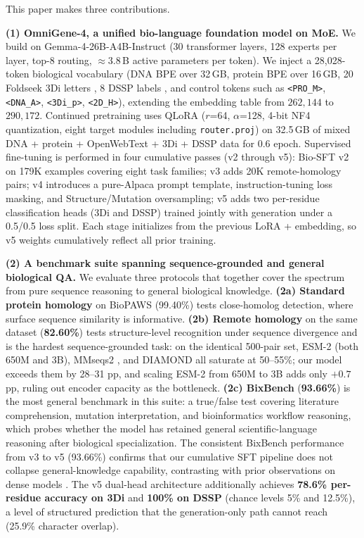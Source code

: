 \documentclass[11pt]{article}
\begin{document}
This paper makes three contributions.

\textbf{(1) OmniGene-4, a unified bio-language foundation model on MoE.} We build on Gemma-4-26B-A4B-Instruct \citep{gemmateam2025} (30 transformer layers, 128 experts per layer, top-8 routing, $\approx 3.8$\,B active parameters per token). We inject a 28{,}028-token biological vocabulary (DNA BPE over 32\,GB, protein BPE over 16\,GB, 20 Foldseek 3Di letters \citep{vankempen2024foldseek}, 8 DSSP labels \citep{kabsch1983dssp}, and control tokens such as \texttt{<PRO\_M>}, \texttt{<DNA\_A>}, \texttt{<3Di\_p>}, \texttt{<2D\_H>}), extending the embedding table from $262{,}144$ to $290{,}172$. Continued pretraining uses QLoRA \citep{dettmers2023qlora, hu2022lora} ($r$=64, $\alpha$=128, 4-bit NF4 quantization, eight target modules including \texttt{router.proj}) on 32.5\,GB of mixed DNA + protein + OpenWebText + 3Di + DSSP data for 0.6 epoch. Supervised fine-tuning is performed in four cumulative passes (v2 through v5): Bio-SFT v2 on 179K examples covering eight task families; v3 adds 20K remote-homology pairs; v4 introduces a pure-Alpaca prompt template, instruction-tuning loss masking, and Structure/Mutation oversampling; v5 adds two per-residue classification heads (3Di and DSSP) trained jointly with generation under a 0.5/0.5 loss split. Each stage initializes from the previous LoRA + embedding, so v5 weights cumulatively reflect all prior training.

\textbf{(2) A benchmark suite spanning sequence-grounded and general biological QA.} We evaluate three protocols that together cover the spectrum from pure sequence reasoning to general biological knowledge. \textbf{(2a) Standard protein homology} on BioPAWS \citep{wang2026biopaws} (99.40\%) tests close-homolog detection, where surface sequence similarity is informative. \textbf{(2b) Remote homology} on the same dataset (\textbf{82.60\%}) tests structure-level recognition under sequence divergence and is the hardest sequence-grounded task: on the identical 500-pair set, ESM-2 \citep{lin2023evolutionary} (both 650M and 3B), MMseqs2 \citep{steinegger2017mmseqs2}, and DIAMOND \citep{buchfink2021diamond} all saturate at 50--55\%; our model exceeds them by 28--31 pp, and scaling ESM-2 from 650M to 3B adds only $+0.7$ pp, ruling out encoder capacity as the bottleneck. \textbf{(2c) BixBench} \citep{bixbench2024} (\textbf{93.66\%}) is the most general benchmark in this suite: a true/false test covering literature comprehension, mutation interpretation, and bioinformatics workflow reasoning, which probes whether the model has retained general scientific-language reasoning after biological specialization. The consistent BixBench performance from v3 to v5 (93.66\%) confirms that our cumulative SFT pipeline does not collapse general-knowledge capability, contrasting with prior observations on dense models \citep{luo2023forgetting}. The v5 dual-head architecture additionally achieves \textbf{78.6\% per-residue accuracy on 3Di} and \textbf{100\% on DSSP} (chance levels 5\% and 12.5\%), a level of structured prediction that the generation-only path cannot reach (25.9\% character overlap).
\end{document}
